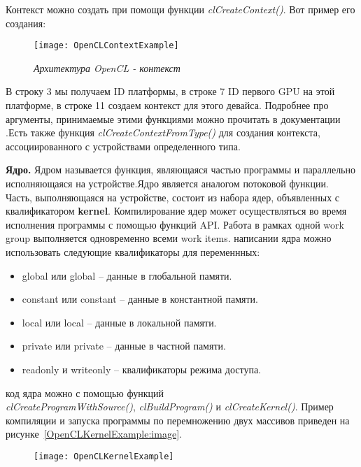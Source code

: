 {\begin{itemize}
		\end{itemize}
	Контекст можно создать при помощи функции \textit{clCreateContext()}. Вот пример его создания:
	\begin{figure}[H]
		\texttt{[image: OpenCLContextExample]}
		\caption{\textit{Архитектура OpenCL - контекст}}
		\label{OpenCLContextExample:image}
	\end{figure}
	В строку 3 мы получаем ID платформы, в строке 7 ID первого GPU на этой платформе, в строке 11 создаем контекст для этого девайса. Подробнее про аргументы, принимаемые этими функциями можно прочитать в документации .Есть также функция \textit{clCreateContextFromType()} для создания контекста, ассоциированного с устройствами определенного типа.
	\par\textbf{Ядро.} Ядром называется функция, являющаяся частью программы и параллельно исполняющаяся на устройстве.Ядро является аналогом потоковой функции. Часть, выполняющаяся на устройстве, состоит из набора ядер, объявленных с квалификатором \textbf{\textunderscore \textunderscore kernel}. Компилирование ядер может осуществляться во время исполнения программы с помощью функций API. Работа в рамках одной work group выполняется одновременно всеми work items.
	 написании ядра можно использовать следующие квалификаторы для переменнных:
		\begin{itemize}
			\item\textunderscore \textunderscore global или global – данные в глобальной памяти.
			\item\textunderscore \textunderscore constant или constant – данные в константной памяти.
			\item\textunderscore \textunderscore local или local – данные в локальной памяти.
			\item\textunderscore \textunderscore private или private – данные в частной памяти.
			\item\textunderscore \textunderscore read\textunderscore only и \textunderscore \textunderscore write\textunderscore only – квалификаторы режима доступа.
		\end{itemize}
	 код ядра можно с помощью функций \\ \textit{clCreateProgramWithSource()}, \textit{clBuildProgram()} и \textit{clCreateKernel()}. Пример компиляции и запуска программы по перемножению двух массивов приведен на рисунке~\ref{OpenCLKernelExample:image}.
	\begin{figure}[H]
		\texttt{[image: OpenCLKernelExample]}

\end{figure}}
